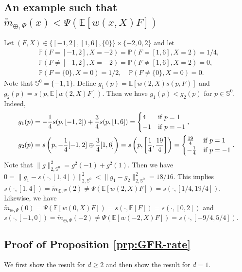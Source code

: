 \documentclass[11pt,reqno]{amsart}
\begin{document}
\subsection{An example such that $\tilde{m}_{\oplus,\Psi}(x) < \Psi(\mathbb{E}[w(x,X)F])$}\label{subsec:app-counter-exm}
Let $(F,X) \in \{[-1,2], [1,6], \{0\}\} \times \{-2,0,2\}$ and let
\begin{align*}
&\mathbb{P}(F=[-1,2], X=-2)=\mathbb{P}(F=[1,6], X=2)=1/4,\\
&\mathbb{P}(F \neq [-1,2], X=-2)=\mathbb{P}(F \neq [1,6], X=2)=0,\\
&\mathbb{P}(F = \{0\},X=0)=1/2,\quad \mathbb{P}(F \neq \{0\}, X=0)=0.
\end{align*}
Note that $\mathbb{S}^0=\{-1,1\}$. Define $g_1(p)=\mathbb{E}[w(2,X)s(p,F)]$ and $g_2(p)=s(p, \mathbb{E}[w(2,X)F])$. Then we have $g_1(p)< g_2(p)$ for $p \in \mathbb{S}^0$. Indeed,
\begin{align*}
g_1(p) & = -{1 \over 4}s(p,[-1,2]) + {3 \over 4}s(p,[1,6])=
\begin{cases}
4 & \text{if}\ p=1\\ %
-1 & \text{if}\ p=-1
\end{cases},\\
g_2(p) &= s\left(p, -{1 \over 4}[-1,2]\oplus {3 \over 4}[1,6]\right)=s\left(p,\left[{1 \over 4},{19 \over 4}\right]\right)=
\begin{cases}
{19 \over 4} & \text{if}\ p=1\\
-{1 \over 4} & \text{if}\ p=-1
\end{cases}.
\end{align*}
Note that $\|g\|_{2,\mathbb{S}^0}^2=g^2(-1) + g^2(1)$. Then we have $0 = \|g_1-s(\cdot,[1,4])\|_{2,\mathbb{S}^0}^2 <\|g_1 - g_2\|_{2,\mathbb{S}^0}^2=18/16$. This implies $s(\cdot,[1,4])=\tilde{m}_{\oplus,\Psi}(2) \neq \Psi(\mathbb{E}[w(2,X)F])=s(\cdot,[1/4,19/4])$. Likewise, we have $\tilde{m}_{\oplus,\Psi}(0) = \Psi(\mathbb{E}[w(0,X)F])=s(\cdot, \mathbb{E}[F])=s(\cdot,[0,2])$ and $s(\cdot,[-1,0])=\tilde{m}_{\oplus,\Psi}(-2) \neq \Psi(\mathbb{E}[w(-2,X)F])=s(\cdot,[-9/4,5/4])$.

\subsection{Proof of Proposition \ref{prp:GFR-rate}}

We first show the result for $d\geq 2$ and then show the result for $d=1$. 
\end{document}
